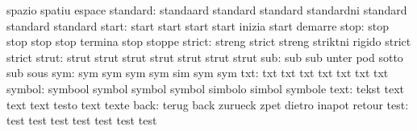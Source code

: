                            spazio                    spatiu
                           espace
                 standard: standaard                 standard
                           standard                  standardni
                           standard                  standard
                           standard
                    start: start                     start
                           start                     start
                           inizia                    start
                           demarre
                     stop: stop                      stop
                           stop                      stop
                           termina                   stop
                           stoppe
                   strict: streng                    strict
                           streng                    striktni
                           rigido                    strict
                           strict
                    strut: strut                     strut
                           strut                     strut
                           strut                     strut
                           strut
                      sub: sub                       sub
                           unter                     pod
                           sotto                     sub
                           sous
                      sym: sym                       sym
                           sym                       sym
                           sim                       sym
                           sym
                      txt: txt                       txt
                           txt                       txt
                           txt                       txt
                           txt
                   symbol: symbool                   symbol
                           symbol                    symbol
                           simbolo                   simbol
                           symbole
                     text: tekst                     text
                           text                      text
                           testo                     text
                           texte
                     back: terug                     back
                           zurueck                   zpet
                           dietro                    inapot
                           retour
                     test: test                      test
                           test                      test
                           test                      test
                           test
